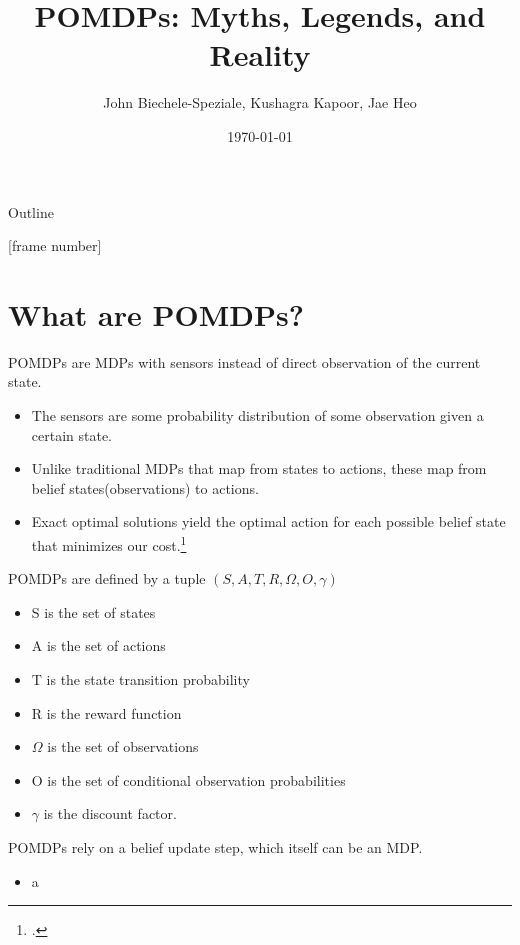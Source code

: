 \documentclass[presentation, smaller]{beamer}
\author{John Biechele-Speziale, Kushagra Kapoor, Jae Heo}
\date{\today}
\title{POMDPs: Myths, Legends, and Reality}
\begin{document}
\maketitle
\begin{frame}{Outline}
\setcounter{tocdepth}{1}
\tableofcontents
\end{frame}

[frame number]

\section{What are POMDPs?}
\label{sec:org4e92377}

\begin{frame}[label={sec:orgbebae4d}]{POMDPs are MDPs with sensors instead of direct observation of the current state.}
\begin{itemize}
\item The sensors are some probability distribution of some observation given a certain state.
\pause
\item Unlike traditional MDPs that map from states to actions, these map from belief states(observations) to actions.
\pause
\item Exact optimal solutions yield the optimal action for each possible belief state that minimizes our cost.\footcite{woodcockFormalMethodsPractice2009}
\end{itemize}
\end{frame}

\begin{frame}[label={sec:org6d9aed9}]{POMDPs are defined by a tuple \((S,A,T,R,\Omega,O,\gamma)\)}
\begin{itemize}
\item S is the set of states
\pause
\item A is the set of actions
\pause
\item T is the state transition probability
\pause
\item R is the reward function
\pause
\item \(\Omega\) is the set of observations
\pause
\item O is the set of conditional observation probabilities
\pause
\item \(\gamma\) is the discount factor.
\end{itemize}
\end{frame}

\begin{frame}[label={sec:orgafb8e18}]{POMDPs rely on a belief update step, which itself can be an MDP.}
\begin{itemize}
\item a
\end{itemize}
\end{frame}
\end{document}
